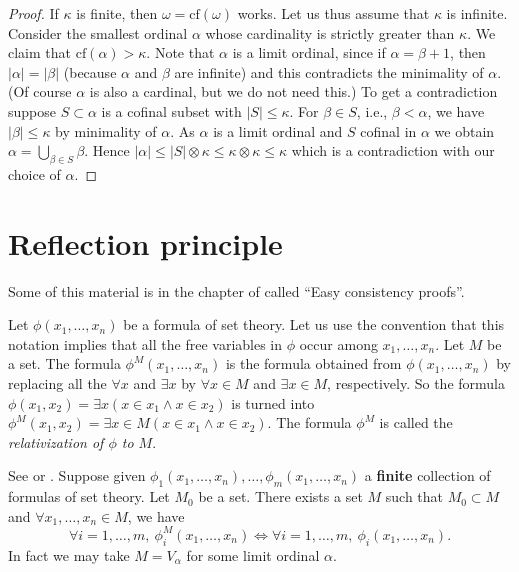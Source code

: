 \begin{proof}
If $\kappa$ is finite, then $\omega = \text{cf}(\omega)$ works.
Let us thus assume that $\kappa$ is infinite.
Consider the smallest ordinal $\alpha$ whose cardinality is strictly greater
than $\kappa$. We claim that $\text{cf}(\alpha) > \kappa$.
Note that $\alpha$ is a limit ordinal, since if $\alpha = \beta + 1$, then
$|\alpha| = |\beta|$ (because $\alpha$ and $\beta$ are infinite) and
this contradicts the minimality of $\alpha$. (Of course $\alpha$ is also
a cardinal, but we do not need this.) To get a contradiction
suppose $S \subset \alpha$ is a cofinal
subset with $|S| \leq \kappa$. For $\beta \in S$, i.e., $\beta < \alpha$,
we have $|\beta| \leq \kappa$ by minimality of $\alpha$. As $\alpha$ is
a limit ordinal and $S$ cofinal in $\alpha$ we obtain
$\alpha = \bigcup_{\beta \in S} \beta$. Hence
$|\alpha| \leq |S| \otimes \kappa \leq \kappa \otimes \kappa \leq \kappa$
which is a contradiction with our choice of $\alpha$.
\end{proof}



\section{Reflection principle}
\label{section-reflection-principle}

\noindent
Some of this material is in the chapter of \cite{Kunen} called
``Easy consistency proofs''.

\medskip\noindent
Let $\phi(x_1, \ldots, x_n)$ be a formula of set theory.
Let us use the convention that this notation implies that
all the free variables in $\phi$ occur among $x_1, \ldots, x_n$.
Let $M$ be a set.
The formula $\phi^M(x_1, \ldots, x_n)$ is the
formula obtained from $\phi(x_1, \ldots, x_n)$ by replacing all the
$\forall x$ and $\exists x$ by $\forall x\in M$ and $\exists x\in M$,
respectively. So the formula
$\phi(x_1, x_2) = \exists x (x\in x_1 \wedge x\in x_2)$
is turned  into
$\phi^M(x_1, x_2) = \exists x \in M (x\in x_1 \wedge x\in x_2)$.
The formula $\phi^M$ is called the {\it relativization of $\phi$
to $M$}.

\begin{theorem}
\label{theorem-reflection-principle}
See \cite[Theorem 12.14]{Jech} or \cite[Theorem 7.4]{Kunen}.
Suppose given $\phi_1(x_1, \ldots, x_n), \ldots, \phi_m(x_1, \ldots, x_n)$
a {\bf finite} collection of
formulas of set theory. Let $M_0$ be a set.
There exists a set $M$ such that
$M_0 \subset M$ and
$\forall x_1, \ldots, x_n \in M$, we have
$$
\forall i = 1, \ldots, m, \ 
\phi_i^{M}(x_1, \ldots, x_n)
\Leftrightarrow
\forall i = 1, \ldots, m, \ 
\phi_i(x_1, \ldots, x_n).
$$
In fact we may take $M = V_\alpha$ for some limit ordinal $\alpha$.
\end{theorem}

